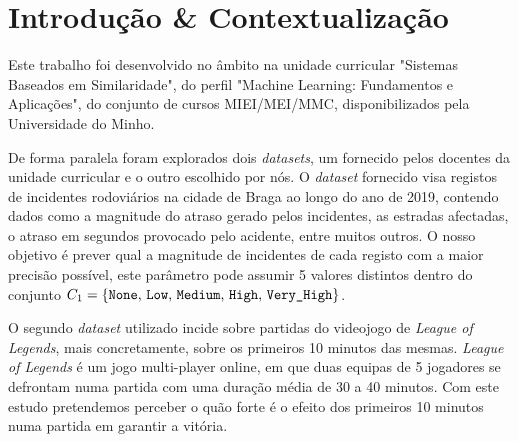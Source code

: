 \section{Introdução \& Contextualização}

Este trabalho foi desenvolvido no âmbito na unidade curricular "Sistemas Baseados em Similaridade", do perfil "Machine Learning: Fundamentos e Aplicações", do conjunto de cursos MIEI/MEI/MMC, disponibilizados pela Universidade do Minho.

De forma paralela foram explorados dois \textit{datasets}, um fornecido pelos docentes da unidade curricular e o outro escolhido por nós. O \textit{dataset} fornecido visa registos de incidentes rodoviários na cidade de Braga ao longo do ano de 2019, contendo dados como a magnitude do atraso gerado pelos incidentes, as estradas afectadas, o atraso em segundos provocado pelo acidente, entre muitos outros. O nosso objetivo é prever qual a magnitude de incidentes de cada registo com a maior precisão possível, este parâmetro pode assumir 5 valores distintos dentro do conjunto $C_1 = \{\mbox{\texttt{None}, \texttt{Low}, \texttt{Medium}, \texttt{High}, \texttt{Very\_High}}\}$.

O segundo \textit{dataset} utilizado incide sobre partidas do videojogo de \textit{League of Legends}, mais concretamente, sobre os primeiros 10 minutos das mesmas. \textit{League of Legends} é um jogo multi-player online, em que duas equipas de 5 jogadores se defrontam numa partida com uma duração média de 30 a 40 minutos. Com este estudo pretendemos perceber o quão forte é o efeito dos primeiros 10 minutos numa partida em garantir a vitória. 
